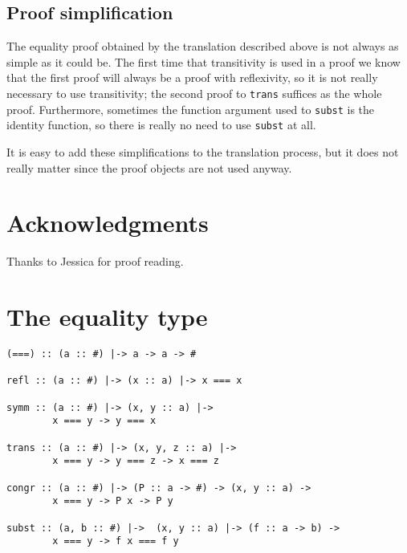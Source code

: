 \documentclass{llncs}[12pt]             %
\newcommand{\te}[1]{{\tt #1}}
\begin{document}
\subsection{Proof simplification}
The equality proof obtained by the translation described above is not
always as simple as it could be.
The first time that transitivity is used in a proof we know that the
first proof will always be a proof with reflexivity, so it is not really
necessary to use transitivity; the second proof to \te{trans} suffices
as the whole proof.  Furthermore, sometimes the function argument used
to \te{subst} is the identity function, so there is really no need to use
\te{subst} at all.

It is easy to add these simplifications to the translation process,
but it does not really matter since the proof objects are not used anyway.

\section{Acknowledgments}
Thanks to Jessica for proof reading.


 

\appendix
\section{The equality type}
\label{app:Id}
\begin{verbatim}
(===) :: (a :: #) |-> a -> a -> #

refl :: (a :: #) |-> (x :: a) |-> x === x

symm :: (a :: #) |-> (x, y :: a) |->
        x === y -> y === x

trans :: (a :: #) |-> (x, y, z :: a) |-> 
        x === y -> y === z -> x === z

congr :: (a :: #) |-> (P :: a -> #) -> (x, y :: a) -> 
        x === y -> P x -> P y

subst :: (a, b :: #) |->  (x, y :: a) |-> (f :: a -> b) ->
        x === y -> f x === f y
\end{verbatim}
\end{document}
